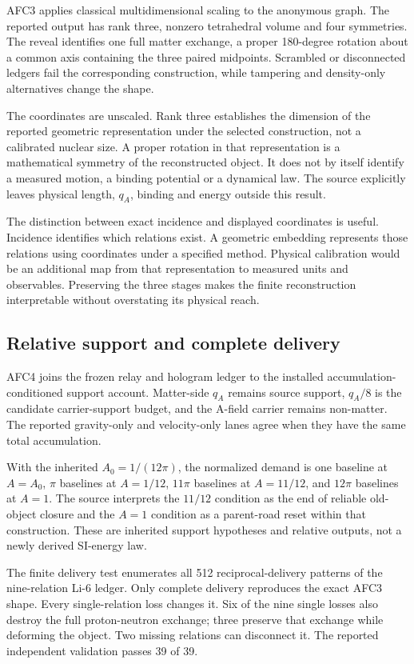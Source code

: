 AFC3 applies classical multidimensional scaling to the anonymous graph. The reported output has rank three, nonzero tetrahedral volume and four symmetries. The reveal identifies one full matter exchange, a proper 180-degree rotation about a common axis containing the three paired midpoints. Scrambled or disconnected ledgers fail the corresponding construction, while tampering and density-only alternatives change the shape.\cite{viiatom}

The coordinates are unscaled. Rank three establishes the dimension of the reported geometric representation under the selected construction, not a calibrated nuclear size. A proper rotation in that representation is a mathematical symmetry of the reconstructed object. It does not by itself identify a measured motion, a binding potential or a dynamical law. The source explicitly leaves physical length, $q_A$, binding and energy outside this result.

The distinction between exact incidence and displayed coordinates is useful. Incidence identifies which relations exist. A geometric embedding represents those relations using coordinates under a specified method. Physical calibration would be an additional map from that representation to measured units and observables. Preserving the three stages makes the finite reconstruction interpretable without overstating its physical reach.

\subsection{Relative support and complete delivery}

AFC4 joins the frozen relay and hologram ledger to the installed accumulation-conditioned support account. Matter-side $q_A$ remains source support, $q_A/8$ is the candidate carrier-support budget, and the A-field carrier remains non-matter. The reported gravity-only and velocity-only lanes agree when they have the same total accumulation.

With the inherited $A_0=1/(12\pi)$, the normalized demand is one baseline at $A=A_0$, $\pi$ baselines at $A=1/12$, $11\pi$ baselines at $A=11/12$, and $12\pi$ baselines at $A=1$. The source interprets the $11/12$ condition as the end of reliable old-object closure and the $A=1$ condition as a parent-road reset within that construction. These are inherited support hypotheses and relative outputs, not a newly derived SI-energy law.\cite{viiatom}

The finite delivery test enumerates all 512 reciprocal-delivery patterns of the nine-relation Li-6 ledger. Only complete delivery reproduces the exact AFC3 shape. Every single-relation loss changes it. Six of the nine single losses also destroy the full proton-neutron exchange; three preserve that exchange while deforming the object. Two missing relations can disconnect it. The reported independent validation passes 39 of 39.

